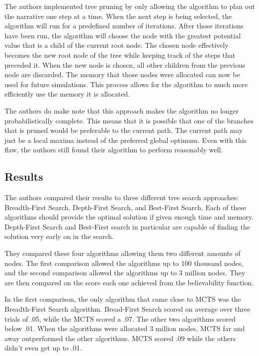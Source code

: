 \documentclass{sig-alternate}
\begin{document}
The authors implemented tree pruning by only allowing the algorithm to plan out the narrative one step at a time. When the next step is being selected, the algorithm will run for a predefined number of iterations. After those iterations have been run, the algorithm will choose the node with the greatest potential value that is a child of the current root node. The chosen node effectively becomes the new root node of the tree while keeping track of the steps that preceded it. When the new node is chosen, all other children from the previous node are discarded. The memory that those nodes were allocated can now be used for future simulations. This process allows for the algorithm to much more efficiently use the memory it is allocated.

The authors do make note that this approach makes the algorithm no longer probabilistically complete. This means that it is possible that one of the branches that is pruned would be preferable to the current path. The current path may just be a local maxima instead of the preferred global optimum. Even with this flaw, the authors still found their algorithm to perform reasonably well. 

\subsection{Results}
The authors compared their results to three different tree search approaches: Breadth-First Search, Depth-First Search, and Best-First Search\cite{Narrative}. Each of these algorithms should provide the optimal solution if given enough time and memory. Depth-First Search and Best-First search in particular are capable of finding the solution very early on in the search.

They compared these four algorithms allowing them two different amounts of nodes. The first comparison allowed the algorithms up to 100 thousand nodes, and the second comparison allowed the algorithms up to 3 million nodes. They are then compared on the score each one achieved from the believability function.

In the first comparison, the only algorithm that came close to MCTS was the Breadth-First Search algorithm. Bread-First Search scored on average over three trials of .05, while the MCTS scored a .07. The other two algorithms scored below .01. When the algorithms were allocated 3 million nodes, MCTS far and away outperformed the other algorithms. MCTS scored .09 while the others didn't even get up to .01.
\end{document}
